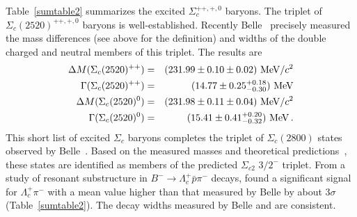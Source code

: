 Table~\ref{sumtable2} summarizes the excited $\Sigma_c^{++,+,0}$ baryons.
The triplet of $\Sigma_c(2520)^{++,+,0}$ baryons is well-established. 
Recently Belle~\cite{SHLee:2014} 
precisely measured the mass differences (see above for the definition)  
and widths of the double charged and neutral members of this triplet.
The results are
\begin{eqnarray}
\Delta M(\Sigma_c(2520)^{++}) & = & (231.99\pm 0.10\pm 0.02){\rm\ MeV}/c^2 \\ 
\Gamma(\Sigma_c(2520)^{++}) & = & (14.77\pm 0.25^{+0.18}_{-0.30}){\rm\ MeV} \\ 
\Delta M(\Sigma_c(2520)^{0}) & = & (231.98\pm 0.11\pm 0.04){\rm\ MeV}/c^2 \\ 
\Gamma(\Sigma_c(2520)^{0}) & = & (15.41\pm 0.41^{+0.20}_{-0.32}){\rm\ MeV}\,.
\end{eqnarray} 
This short list of excited $\Sigma_c$ baryons completes the triplet 
of $\Sigma_c(2800)$ states observed by Belle~\cite{Mizuk:2004yu}. Based 
on the measured masses and theoretical predictions~\cite{Copley:1979wj,Pirjol:1997nh}, 
these states are identified as members of the predicted $\Sigma_{c2}$ $3/2^-$
triplet. From a study of resonant substructure 
in $B^-\rightarrow \Lambda_c^+\bar{p}\pi^-$ decays, \babar found 
a significant signal for $\Lambda_c^+\pi^-$ with a mean value 
higher than that measured by Belle by about $3\sigma$
(Table~\ref{sumtable2}). The decay widths measured by
Belle and \babar are consistent.


